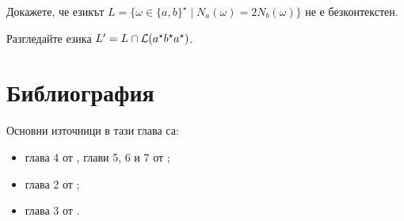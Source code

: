 \begin{problem}
  Докажете, че езикът $L = \{\omega \in \{a,b\}^\star \mid N_a(\omega) = 2N_b(\omega)\}$ не е безконтекстен.
\end{problem}
\begin{hint}
  Разгледайте езика $L' = L \cap \mathcal{L}(a^\star b^\star a^\star)$.
\end{hint}

\section*{Библиография}

Основни източници в тази глава са:
\begin{itemize}
\item 
  глава 4 от \cite{hopcroft1}, глави 5, 6 и 7 от \cite{hopcroft2};
\item
  глава 2 от \cite{sipser1};
\item
  глава 3 от \cite{papadimitriou}.
\end{itemize}




